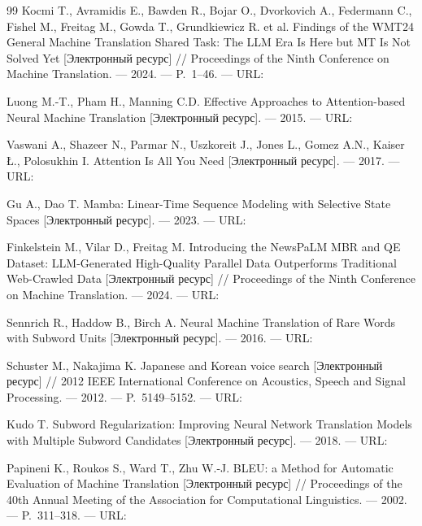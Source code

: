 \sloppy
\begin{thebibliography}{99}
	Kocmi T., Avramidis E., Bawden R., Bojar O., Dvorkovich A., Federmann C., Fishel M., Freitag M., Gowda T., Grundkiewicz R. et al.
	Findings of the WMT24 General Machine Translation Shared Task: The LLM Era Is Here but MT Is Not Solved Yet [Электронный ресурс] // Proceedings of the Ninth Conference on Machine Translation. — 2024. — P.~1--46. — URL:~

	Luong M.-T., Pham H., Manning C.D.
	Effective Approaches to Attention-based Neural Machine Translation [Электронный ресурс]. — 2015. — URL:~

	Vaswani A., Shazeer N., Parmar N., Uszkoreit J., Jones L., Gomez A.N., Kaiser Ł., Polosukhin I.
	Attention Is All You Need [Электронный ресурс]. — 2017. — URL:~

	Gu A., Dao T.
	Mamba: Linear-Time Sequence Modeling with Selective State Spaces [Электронный ресурс]. — 2023. — URL:~

	Finkelstein M., Vilar D., Freitag M.
	Introducing the NewsPaLM MBR and QE Dataset: LLM-Generated High-Quality Parallel Data Outperforms Traditional Web-Crawled Data [Электронный ресурс] // Proceedings of the Ninth Conference on Machine Translation. — 2024. — URL:~

	Sennrich R., Haddow B., Birch A.
	Neural Machine Translation of Rare Words with Subword Units [Электронный ресурс]. — 2016. — URL:~

	Schuster M., Nakajima K.
	Japanese and Korean voice search [Электронный ресурс] // 2012 IEEE International Conference on Acoustics, Speech and Signal Processing. — 2012. — P.~5149--5152. — URL:~

	Kudo T.
	Subword Regularization: Improving Neural Network Translation Models with Multiple Subword Candidates [Электронный ресурс]. — 2018. — URL:~

	Papineni K., Roukos S., Ward T., Zhu W.-J.
	BLEU: a Method for Automatic Evaluation of Machine Translation [Электронный ресурс] // Proceedings of the 40th Annual Meeting of the Association for Computational Linguistics. — 2002. — P.~311--318. — URL:~


\end{thebibliography}

